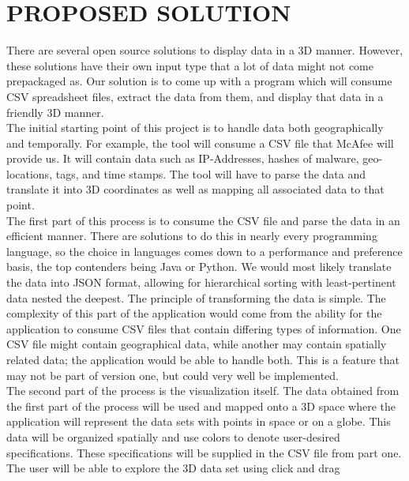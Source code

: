 \documentclass[journal,10pt,onecolumn,compsoc]{IEEEtran}
\begin{document}
\section {PROPOSED SOLUTION}
There are several open source solutions to display data in a 3D manner. However, these solutions have their own input type that a lot of data might not come prepackaged as. Our solution is to come up with a program which will consume CSV spreadsheet files, extract the data from them, and display that data in a friendly 3D manner. \\ 
The initial starting point of this project is to handle data both geographically and temporally. For example, the tool will consume a CSV file that McAfee will provide us. It will contain data such as IP-Addresses, hashes of malware, geo-locations, tags, and time stamps. The tool will have to parse the data and translate it into 3D coordinates as well as mapping all associated data to that point. \\
The first part of this process is to consume the CSV file and parse the data in an efficient manner. There are solutions to do this in nearly every programming language, so the choice in languages comes down to a performance and preference basis, the top contenders being Java or Python. We would most likely translate the data into JSON format, allowing for hierarchical sorting with least-pertinent data nested the deepest. The principle of transforming the data is simple. The complexity of this part of the application would come from the ability for the application to consume CSV files that contain differing types of information. One CSV file might contain geographical data, while another may contain spatially related data; the application would be able to handle both. This is a feature that may not be part of version one, but could very well be implemented. \\
The second part of the process is the visualization itself. The data obtained from the first part of the process will be used and mapped onto a 3D space where the application will represent the data sets with points in space or on a globe. This data will be organized spatially and use colors to denote user-desired specifications. These specifications will be supplied in the CSV file from part one. The user will be able to explore the 3D data set using click and drag
\end{document}
